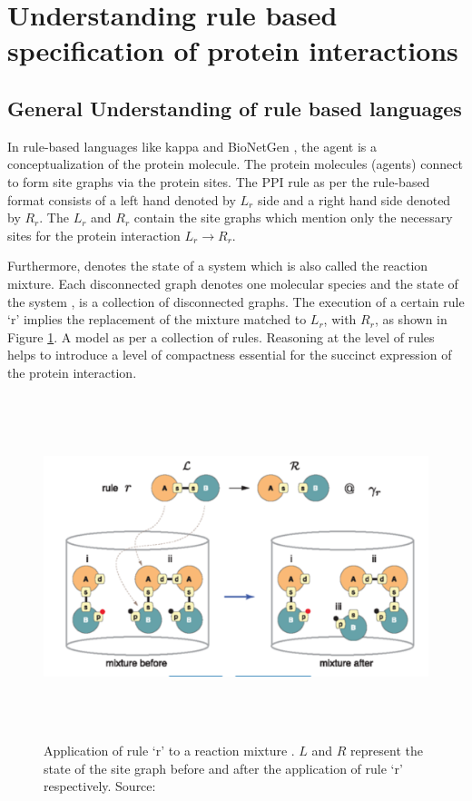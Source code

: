 \documentclass[msc,deptreport,ai]{infthesis}      %
\begin{document}
\section{Understanding rule based specification of protein interactions}
\subsection{General Understanding of rule based languages}
In rule-based languages like kappa \cite{kappa} and BioNetGen \cite{bioNetGen}, the agent is a conceptualization of the protein molecule. The protein molecules (agents) connect to form site graphs via the protein sites. The PPI rule as per the rule-based format consists of a left hand denoted by $L_r$  side and a right hand side denoted by $R_r$. The $L_r$ and $R_r$ contain the site graphs which mention only the necessary sites for the protein interaction $L_r \to R_r$. 

Furthermore,  denotes the state of a system which is also called the reaction mixture. Each disconnected graph denotes one molecular species and the state of the system ,  is a collection of disconnected graphs. The execution of a certain rule `r' implies the replacement of the mixture matched to $L_r$, with $R_r$, as shown in Figure \ref{fig:mixture}. A model as per \cite{kappaPlatform} a collection of rules. Reasoning at the level of rules helps to introduce a level of compactness essential for the succinct expression of the protein interaction. 

\begin{figure}[H]
	\centering
	\captionsetup{justification=centering}
	\includegraphics[width=\linewidth,height=10cm,keepaspectratio]{mixture.png}	
	\caption{Application of rule `r' to a reaction mixture . $L$ and $R$ represent the state of the site graph before and after the application of rule `r'  respectively. Source: \cite{kappaPlatform}}
	\label{fig:mixture}
\end{figure}
\end{document}
